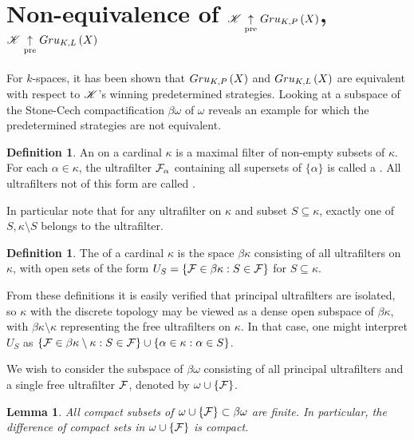 \documentclass{amsart}
\newtheorem{lemma}[theorem]{Lemma}
\theoremstyle{definition}
\newtheorem{definition}[theorem]{Definition}
\begin{document}
\section{
Non-equivalence of \(\mathscr{K}\underset{\text{pre}}{\uparrow}Gru_{K,P}\left({X}\right)\), \(\mathscr{K}\underset{\text{pre}}{\uparrow}Gru_{K,L}\left({X}\right)\)
}

For \(k\)-spaces, it has been shown that \(Gru_{K,P}\left({X}\right)\) and \(Gru_{K,L}\left({X}\right)\)
are equivalent with respect to \(\mathscr{K}\)'s winning predetermined strategies.
Looking at a subspace of the Stone-Cech compactification \(\beta\omega\) of
\(\omega\) reveals an example for which the predetermined strategies are not
equivalent.

\begin{definition}
  An  on a cardinal \(\kappa\) is a maximal filter of non-empty
  subsets of \(\kappa\). For each \(\alpha\in \kappa\), the ultrafilter
  \(\mathcal{F}_\alpha\) containing all supersets of \(\{\alpha\}\) is called a
  . All
  ultrafilters not of this form are called .
\end{definition}

In particular note that for any ultrafilter on \(\kappa\) and subset
\(S\subseteq\kappa\), exactly one of \(S,\kappa\setminus S\) belongs to
the ultrafilter.

\begin{definition}
  The  of a cardinal
  \(\kappa\) is the space \(\beta\kappa\) consisting
  of all ultrafilters on \(\kappa\), with open sets of the form
  \(U_S=\{\mathcal{F}\in\beta\kappa : S\in\mathcal{F}\}\) for \(S\subseteq \kappa\).
\end{definition}

From these definitions it is easily verified that principal ultrafilters
are isolated, so \(\kappa\) with the discrete topology may be viewed as
a dense open subspace of \(\beta\kappa\), with \(\beta\kappa\setminus\kappa\)
representing the free ultrafilters on \(\kappa\).
In that case, one might interpret \(U_S\) as
\(
  \{\mathcal{F}\in\beta\kappa\setminus\kappa:S\in\mathcal{F}\}
    \cup
  \{\alpha\in\kappa:\alpha\in S\}
\).

We wish to consider the subspace
of \(\beta\omega\) consisting of all principal ultrafilters and a single free
ultrafilter \(\mathcal{F}\), denoted by \(\omega\cup\{\mathcal{F}\}\).

\begin{lemma}
  All compact subsets of \(\omega\cup\{\mathcal{F}\}\subset\beta\omega\) are finite.
  In particular, the difference of compact sets in \(\omega\cup\{\mathcal{F}\}\)
  is compact.
\end{lemma}
\end{document}
